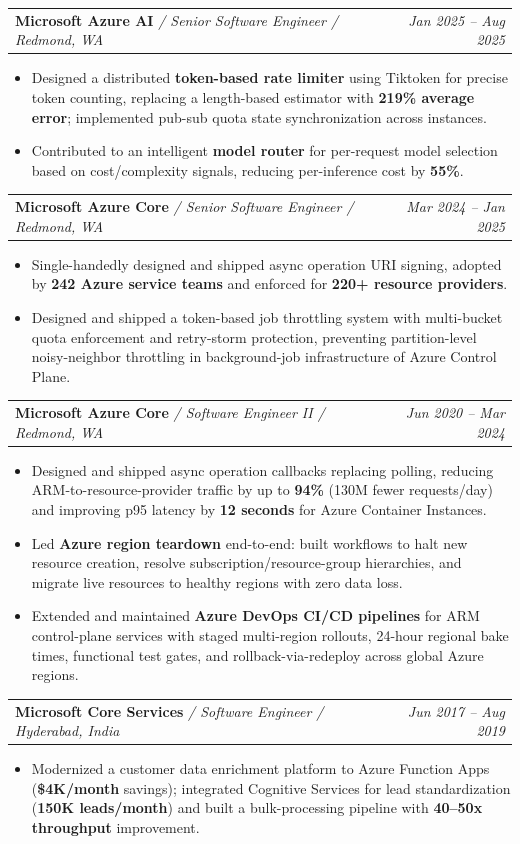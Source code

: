 \documentclass[letterpaper,10pt]{extarticle}
\makeatletter
\newcommand{\resumeSubheading}[4]{
  \vspace{-1pt}\item
    \begin{tabular*}{0.97\textwidth}{l@{\extracolsep{\fill}}r}
      \textbf{#1} \textit{\small / #3 / #4} & \textit{\small #2} \\
    \end{tabular*}\vspace{-5pt}
}
\newcommand{\resumeItemListStart}{\begin{itemize}[leftmargin=*, itemsep=0pt, topsep=2pt, parsep=0pt, partopsep=0pt]}
\newcommand{\resumeItemListEnd}{\end{itemize}\vspace{-4pt}}
\makeatother
\begin{document}
  \resumeSubheading
    {Microsoft Azure AI}{Jan 2025 -- Aug 2025}
    {Senior Software Engineer}{Redmond, WA}
    \resumeItemListStart
      \item\small{Designed a distributed \textbf{token-based rate limiter} using Tiktoken for precise token counting, replacing a length-based estimator with \textbf{219\% average error}; implemented pub-sub quota state synchronization across instances.}
      \item\small{Contributed to an intelligent \textbf{model router} for per-request model selection based on cost/complexity signals, reducing per-inference cost by \textbf{55\%}.}
    \resumeItemListEnd

  \resumeSubheading
    {Microsoft Azure Core}{Mar 2024 -- Jan 2025}
    {Senior Software Engineer}{Redmond, WA}
    \resumeItemListStart
      \item\small{Single-handedly designed and shipped async operation URI signing, adopted by \textbf{242 Azure service teams} and enforced for \textbf{220+ resource providers}.}
      \item\small{Designed and shipped a token-based job throttling system with multi-bucket quota enforcement and retry-storm protection, preventing partition-level noisy-neighbor throttling in background-job infrastructure of Azure Control Plane.}
    \resumeItemListEnd

  \resumeSubheading
    {Microsoft Azure Core}{Jun 2020 -- Mar 2024}
    {Software Engineer II}{Redmond, WA}
    \resumeItemListStart
      \item\small{Designed and shipped async operation callbacks replacing polling, reducing ARM-to-resource-provider traffic by up to \textbf{94\%} (130M fewer requests/day) and improving p95 latency by \textbf{12 seconds} for Azure Container Instances.}
      \item\small{Led \textbf{Azure region teardown} end-to-end: built workflows to halt new resource creation, resolve subscription/resource-group hierarchies, and migrate live resources to healthy regions with zero data loss.}
      \item\small{Extended and maintained \textbf{Azure DevOps CI/CD pipelines} for ARM control-plane services with staged multi-region rollouts, 24-hour regional bake times, functional test gates, and rollback-via-redeploy across global Azure regions.}
    \resumeItemListEnd

  \resumeSubheading
    {Microsoft Core Services}{Jun 2017 -- Aug 2019}
    {Software Engineer}{Hyderabad, India}
    \resumeItemListStart
      \item\small{Modernized a customer data enrichment platform to Azure Function Apps (\textbf{\$4K/month} savings); integrated Cognitive Services for lead standardization (\textbf{150K leads/month}) and built a bulk-processing pipeline with \textbf{40--50x throughput} improvement.}
    \resumeItemListEnd
\end{document}
